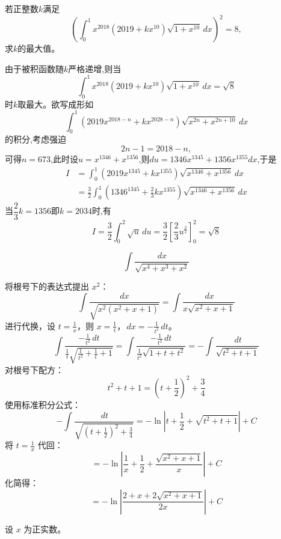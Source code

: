 \begin{questions}
    \question 若正整数$k$满足
    \[
    \left(\int_0^1 x^{2018}(2019 + kx^{10})\sqrt{1 + x^{10}} \, dx\right)^2 = 8,
    \]
    求$k$的最大值。
    \begin{solution}
        由于被积函数随$k$严格递增,则当
        \[
        \int_0^1 x^{2018}(2019 + kx^{10})\sqrt{1 + x^{10}} \, dx = \sqrt{8}
        \]
        时$k$取最大。欲写成形如
        \[
        \int_0^1 (2019x^{2018-n} + kx^{2028-n}) \sqrt{x^{2n} + x^{2n+10}} \, dx
        \]
        的积分,考虑强迫
        \[
        2n-1 = 2018-n,
        \]
        可得$n = 673$,此时设$u=x^{1346}+x^{1356}$,则$du=1346x^{1345}+1356x^{1355} dx $,于是
        \begin{align*}
        I &=\int_0^1 (2019x^{1345} + kx^{1355}) \sqrt{x^{1346} + x^{1356}} \, dx \\
        &=\frac{3}{2}\int_0^1 (1346^{1345} + \frac{2}{3}kx^{1355}) \sqrt{x^{1346} + x^{1356}} \, dx
        \end{align*}
        当$\dfrac{2}{3}k=1356$即$k=2034$时,有
        \[
        I=\frac{3}{2}\int_0^2 \sqrt{u}\, du = \frac{3}{2}\left[\frac{2}{3}u^{\frac{3}{2}}\right]^2_0=\sqrt{8}
        \]
    \end{solution}

    \question
\[
\int \frac{dx}{\sqrt{x^4 + x^3 + x^2}}
\]
\begin{solution}
将根号下的表达式提出 $x^2$：
\[
\int \frac{dx}{\sqrt{x^2\left(x^2 + x + 1\right)}} = \int \frac{\,dx}{x\sqrt{x^2 + x + 1}}
\]
进行代换，设 $t = \frac{1}{x}$，则 $x = \frac{1}{t}$，$\,dx = -\frac{1}{t^2} \,dt$。
\[
\int \frac{-\frac{1}{t^2} \,dt}{\frac{1}{t}\sqrt{\frac{1}{t^2} + \frac{1}{t} + 1}} = \int \frac{-\frac{1}{t^2} \,dt}{\frac{1}{t^2}\sqrt{1 + t + t^2}} = -\int \frac{\,dt}{\sqrt{t^2 + t + 1}}
\]
对根号下配方：
\[
t^2 + t + 1 = \left(t + \frac{1}{2}\right)^2 + \frac{3}{4}
\]
使用标准积分公式：
\[
-\int \frac{\,dt}{\sqrt{\left(t + \frac{1}{2}\right)^2 + \frac{3}{4}}} = -\ln\left| t + \frac{1}{2} + \sqrt{t^2 + t + 1} \right| + C
\]
将 $t = \frac{1}{x}$ 代回：
\[
= -\ln\left| \frac{1}{x} + \frac{1}{2} + \frac{\sqrt{x^2 + x + 1}}{x} \right| + C
\]
化简得：
\[
= -\ln\left| \frac{2 + x + 2\sqrt{x^2 + x + 1}}{2x} \right| + C
\]
\end{solution}

    \question 设 $x$ 为正实数。
\end{questions}
